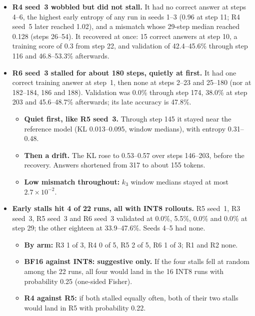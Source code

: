 \documentclass[11pt]{article}
\begin{document}
\begin{itemize}
\begin{itemize}
  \item \textbf{One late dip.} Validation fell to 33.6\% at step 319, between 45.1\% (step 290) and 46.3\% (step 348), while the training score held at 0.51--0.61. The dip came during the run's highest mismatch ($k_3$ 0.06--0.13 per step over steps 315--331). It alone moves seed~3's R4~$-$~R5 in late accuracy from 3.7 points (over the other four late validations) to 6.7.
  \end{itemize}
\item \textbf{R4 seed~3 wobbled but did not stall.} It had no correct answer at steps 4--6, the highest early entropy of any run in seeds 1--3 (0.96 at step 11; R4 seed~5 later reached 1.02), and a mismatch whose 29-step median reached 0.128 (steps 26--54). It recovered at once: 15 correct answers at step 10, a training score of 0.3 from step 22, and validation of 42.4--45.6\% through step 116 and 46.8--53.3\% afterwards.
\item \textbf{R6 seed~3 stalled for about 180 steps, quietly at first.} It had one correct training answer at step~1, then none at steps 2--23 and 25--180 (nor at 182--184, 186 and 188). Validation was 0.0\% through step 174, 38.0\% at step 203 and 45.6--48.7\% afterwards; its late accuracy is 47.8\%.
  \begin{itemize}
  \item \textbf{Quiet first, like R5 seed~3.} Through step 145 it stayed near the reference model (KL 0.013--0.095, window medians), with entropy 0.31--0.48.
  \item \textbf{Then a drift.} The KL rose to 0.53--0.57 over steps 146--203, before the recovery. Answers shortened from 317 to about 155 tokens.
  \item \textbf{Low mismatch throughout:} $k_3$ window medians stayed at most $2.7\times10^{-2}$.
  \end{itemize}
\item \textbf{Early stalls hit 4 of 22 runs, all with INT8 rollouts.} R5 seed~1, R3 seed~3, R5 seed~3 and R6 seed~3 validated at 0.0\%, 5.5\%, 0.0\% and 0.0\% at step 29; the other eighteen at 33.9--47.6\%. Seeds 4--5 had none.
  \begin{itemize}
  \item \textbf{By arm:} R3 1 of 3, R4 0 of 5, R5 2 of 5, R6 1 of 3; R1 and R2 none.
  \item \textbf{BF16 against INT8: suggestive only.} If the four stalls fell at random among the 22 runs, all four would land in the 16 INT8 runs with probability 0.25 (one-sided Fisher).
  \item \textbf{R4 against R5:} if both stalled equally often, both of their two stalls would land in R5 with probability 0.22.

\end{itemize}
\end{itemize}
\end{document}
